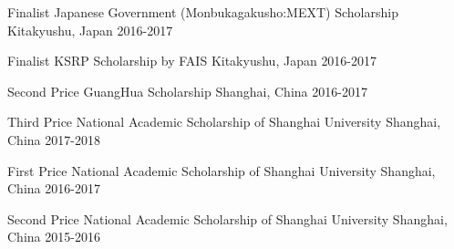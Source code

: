

\begin{cvhonors}

  \cvhonor
    {Finalist} %
    {Japanese Government (Monbukagakusho:MEXT) Scholarship} %
    {Kitakyushu, Japan} %
    {2016-2017} %

  \cvhonor
    {Finalist} %
    {KSRP Scholarship by FAIS} %
    {Kitakyushu, Japan} %
    {2016-2017} %

  \cvhonor
    {Second Price} %
    {GuangHua Scholarship} %
    {Shanghai, China} %
    {2016-2017} %


  \cvhonor
    {Third Price} %
    {National Academic Scholarship of Shanghai University} %
    {Shanghai, China}%
    {2017-2018} %

  \cvhonor
    {First Price} %
    {National Academic Scholarship of Shanghai University} %
    {Shanghai, China}%
    {2016-2017} %

  \cvhonor
    {Second Price} %
    {National Academic Scholarship of Shanghai University} %
    {Shanghai, China} %
    {2015-2016} %
    
\end{cvhonors}

